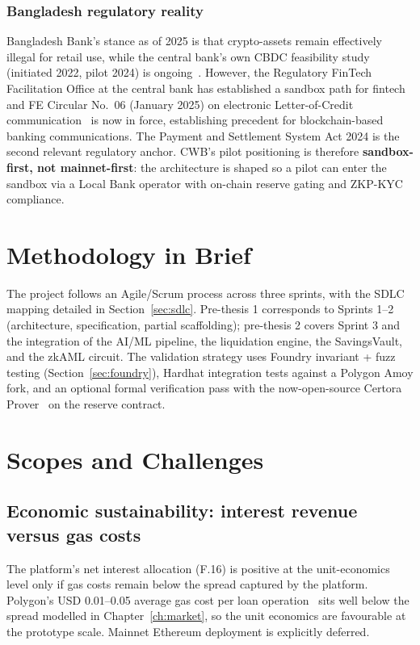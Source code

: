 \documentclass[12pt,a4paper]{report}
\begin{document}
\subsubsection{Bangladesh regulatory reality}
\label{sec:bd-regulatory}
Bangladesh Bank's stance as of 2025 is that crypto-assets remain effectively illegal for retail use, while the central bank's own CBDC feasibility study (initiated 2022, pilot 2024) is ongoing~\cite{ainvestBangladesh2025}. However, the Regulatory FinTech Facilitation Office at the central bank has established a sandbox path for fintech and FE Circular No.~06 (January 2025) on electronic Letter-of-Credit communication~\cite{bangladeshFeCircular2025} is now in force, establishing precedent for blockchain-based banking communications. The Payment and Settlement System Act 2024 is the second relevant regulatory anchor. CWB's pilot positioning is therefore \textbf{sandbox-first, not mainnet-first}: the architecture is shaped so a pilot can enter the sandbox via a Local Bank operator with on-chain reserve gating and ZKP-KYC compliance.

\section{Methodology in Brief}
\label{sec:method-brief}
The project follows an Agile/Scrum process across three sprints, with the SDLC mapping detailed in Section~\ref{sec:sdlc}. Pre-thesis 1 corresponds to Sprints 1--2 (architecture, specification, partial scaffolding); pre-thesis 2 covers Sprint 3 and the integration of the AI/ML pipeline, the liquidation engine, the SavingsVault, and the zkAML circuit. The validation strategy uses Foundry invariant + fuzz testing (Section~\ref{sec:foundry}), Hardhat integration tests against a Polygon Amoy fork, and an optional formal verification pass with the now-open-source Certora Prover~\cite{certoraOpenSource2025} on the reserve contract.

\section{Scopes and Challenges}
\label{sec:scope-challenges}

\subsection{Economic sustainability: interest revenue versus gas costs}
The platform's net interest allocation (F.16) is positive at the unit-economics level only if gas costs remain below the spread captured by the platform. Polygon's USD 0.01--0.05 average gas cost per loan operation~\cite{tolmach2024gas} sits well below the spread modelled in Chapter~\ref{ch:market}, so the unit economics are favourable at the prototype scale. Mainnet Ethereum deployment is explicitly deferred.
\end{document}
